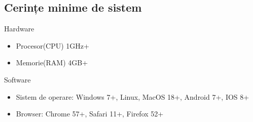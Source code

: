 \newpage
\begin{center}
	\section{Cerințe minime de sistem}
\end{center}
\vspace{2cm}

{\large Hardware}
\begin{itemize}
	\item Procesor(CPU) 1GHz+
	\item Memorie(RAM) 4GB+
\end{itemize}

{\large Software}
\begin{itemize}
	\item Sistem de operare: Windows 7+, Linux, MacOS 18+, Android 7+, IOS 8+
	\item Browser: Chrome 57+, Safari 11+, Firefox 52+
\end{itemize}
